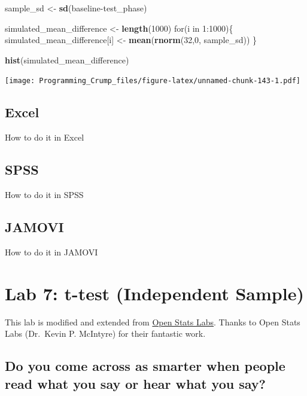 \documentclass[]{book}
\newenvironment{Shaded}{\begin{snugshade}}{\end{snugshade}}
\newcommand{\KeywordTok}[1]{\textcolor[rgb]{0.13,0.29,0.53}{\textbf{{#1}}}}
\newcommand{\DecValTok}[1]{\textcolor[rgb]{0.00,0.00,0.81}{{#1}}}
\newcommand{\StringTok}[1]{\textcolor[rgb]{0.31,0.60,0.02}{{#1}}}
\newcommand{\NormalTok}[1]{{#1}}
\theoremstyle{definition}
\theoremstyle{definition}
\theoremstyle{definition}
\theoremstyle{remark}
\begin{document}
\begin{Shaded}
\begin{Highlighting}[]
\NormalTok{sample_sd   <-}\StringTok{ }\KeywordTok{sd}\NormalTok{(baseline-test_phase)}

\NormalTok{simulated_mean_difference <-}\StringTok{ }\KeywordTok{length}\NormalTok{(}\DecValTok{1000}\NormalTok{)}
\NormalTok{for(i in }\DecValTok{1}\NormalTok{:}\DecValTok{1000}\NormalTok{)\{}
 \NormalTok{simulated_mean_difference[i] <-}\StringTok{ }\KeywordTok{mean}\NormalTok{(}\KeywordTok{rnorm}\NormalTok{(}\DecValTok{32}\NormalTok{,}\DecValTok{0}\NormalTok{, sample_sd))}
\NormalTok{\}}

\KeywordTok{hist}\NormalTok{(simulated_mean_difference)}
\end{Highlighting}
\end{Shaded}

\texttt{[image: Programming\_Crump\_files/figure-latex/unnamed-chunk-143-1.pdf]}

\section{Excel}\label{excel-5}

How to do it in Excel

\section{SPSS}\label{spss-5}

How to do it in SPSS

\section{JAMOVI}\label{jamovi-5}

How to do it in JAMOVI

\chapter{Lab 7: t-test (Independent
Sample)}\label{lab-7-t-test-independent-sample}

This lab is modified and extended from
\href{https://sites.trinity.edu/osl}{Open Stats Labs}. Thanks to Open
Stats Labs (Dr.~Kevin P. McIntyre) for their fantastic work.

\section{Do you come across as smarter when people read what you say or
hear what you
say?}\label{do-you-come-across-as-smarter-when-people-read-what-you-say-or-hear-what-you-say}
\end{document}
